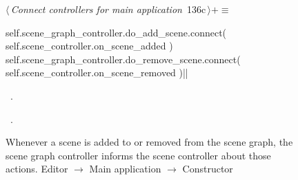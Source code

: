 \documentclass[%
    a4paper,    %
    justified,  %
    nobib,      %
    openany     %
]{tufte-book}
\makeatletter
\renewcommand{\label}[1]{\@tufte@label{##1}}%
\makeatother
\begin{document}
\begin{figure}[!htbp]
\begin{flushleft} \small
\begin{minipage}{\linewidth}\label{scrap85}\raggedright\small
{} $\langle\,${\itshape Connect controllers for main application}\nobreak\ {\footnotesize {136c}}$\,\rangle+\equiv$
\vspace{-1ex}
\begin{pythoncode}
self.scene_graph_controller.do_add_scene.connect(
    self.scene_controller.on_scene_added
)
self.scene_graph_controller.do_remove_scene.connect(
    self.scene_controller.on_scene_removed
)|\NWsep|
\end{pythoncode}
\vspace{1.5ex}
\footnotesize
\begin{list}{}{\setlength{\itemsep}{-\parsep}\setlength{\itemindent}{-\leftmargin}}
\item \NWtxtMacroDefBy\ .
\item \NWtxtMacroRefIn\ .

\item{}
\end{list}
\end{minipage}\vspace{4ex}
\end{flushleft}
\caption{Whenever a scene is added to or removed from the scene graph, the scene graph
  controller informs the scene controller about those actions.
  \newline{}\newline{}Editor $\rightarrow$ Main application $\rightarrow$
  Constructor}
\end{figure}
\end{document}
